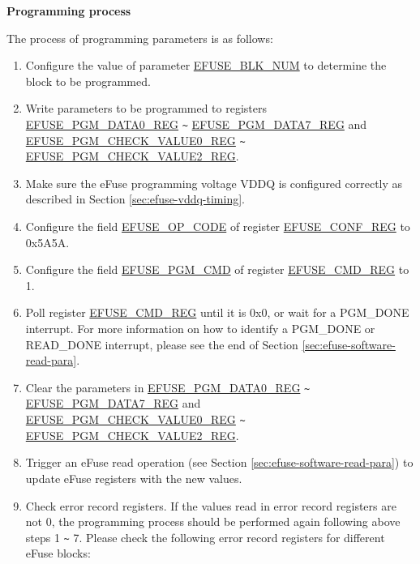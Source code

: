 \documentclass[main\_\_EN.tex]{subfiles}
\begin{document}
{\bfseries Programming process}

The process of programming parameters is as follows:

\begin{enumerate}
\item Configure the value of parameter \hyperref[fielddesc:EFUSEBLKNUM]{EFUSE\_BLK\_NUM} to determine the block to be programmed.

\item Write parameters to be programmed to registers \hyperref[regdesc:EFUSEPGMDATANREG]{EFUSE\_PGM\_DATA0\_REG} \verb+~+ \hyperref[regdesc:EFUSEPGMDATANREG]{EFUSE\_PGM\_DATA7\_REG} and \hyperref[regdesc:EFUSEPGMCHECKVALUENREG]{EFUSE\_PGM\_CHECK\_VALUE0\_REG} \verb+~+ \hyperref[regdesc:EFUSEPGMCHECKVALUENREG]{EFUSE\_PGM\_CHECK\_VALUE2\_REG}.

\item Make sure the eFuse programming voltage VDDQ is configured correctly as described in Section \ref{sec:efuse-vddq-timing}.

\item Configure the field \hyperref[fielddesc:EFUSEOPCODE]{EFUSE\_OP\_CODE} of register \hyperref[regdesc:EFUSECONFREG]{EFUSE\_CONF\_REG} to 0x5A5A.

\item Configure the field \hyperref[fielddesc:EFUSEPGMCMD]{EFUSE\_PGM\_CMD} of register \hyperref[regdesc:EFUSECMDREG]{EFUSE\_CMD\_REG} to 1.

\item Poll register \hyperref[regdesc:EFUSECMDREG]{EFUSE\_CMD\_REG} until it is 0x0, or wait for a PGM\_DONE interrupt. For more information on how to identify a PGM\_DONE or READ\_DONE interrupt, please see the end of Section \ref{sec:efuse-software-read-para}.

\item Clear the parameters in \hyperref[regdesc:EFUSEPGMDATANREG]{EFUSE\_PGM\_DATA0\_REG} \verb+~+ \hyperref[regdesc:EFUSEPGMDATANREG]{EFUSE\_PGM\_DATA7\_REG} and \\ \hyperref[regdesc:EFUSEPGMCHECKVALUENREG]{EFUSE\_PGM\_CHECK\_VALUE0\_REG} \verb+~+ \hyperref[regdesc:EFUSEPGMCHECKVALUENREG]{EFUSE\_PGM\_CHECK\_VALUE2\_REG}.

\item Trigger an eFuse read operation (see Section \ref{sec:efuse-software-read-para}) to update eFuse registers with the new values.
\item Check error record registers. If the values read in error record registers are not 0, the programming process should be performed again following above steps 1 \verb+~+ 7. Please check the following error record registers for different eFuse blocks:


\end{enumerate}
\end{document}
